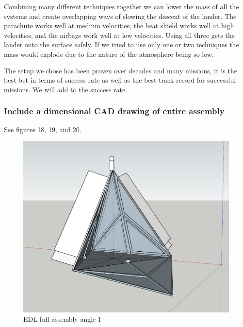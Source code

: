 \documentclass[%
 portrait,
 aapm,
 mph,%
 amsmath,amssymb,
 reprint,%
]{revtex4-2}
\begin{document}
Combining many different techniques together we can lower the mass of all the systems and create overlapping  ways of slowing the descent of the lander.  The parachute works well at medium velocities, the heat shield works well at high velocities, and the airbags work well at low velocities.  Using all three gets the lander onto the surface safely.  If we tried to use only one or two techniques the mass would explode due to the nature of the atmosphere being so low.

The setup we chose has been proven over decades and many missions, it is the best bet in terms of success rate as well as the best track record for successful missions.  We will add to the success rate.


\subsubsection{Include a dimensional CAD drawing of entire assembly}
See figures 18, 19, and 20.
\begin{figure}
  \includegraphics[width=400pt]{DescentandLanding/whol_thing.png}
   \caption{EDL full assembly angle 1}
\end{figure} 
\end{document}
